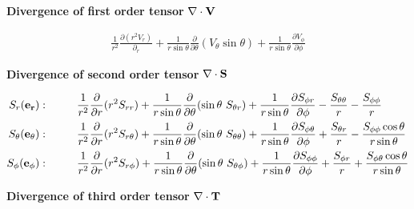 \documentclass[11pt]{article}
\newcommand{\dr}{\frac{\partial}{\partial r}}
\begin{document}
\begin{landscape}
\newpage

\noindent
{{\bf{Divergence of first order tensor}} $\nabla \cdot {\bf{V}}$}

\begin{align}
\frac{1}{r^2} \frac{\partial (r^2 V_r) }{\partial_r} + \frac{1}{r \sin{\theta}}\frac{\partial}{\partial \theta}(V_\theta \sin{\theta}) + \frac{1}{r \sin{\theta}} \frac{\partial V_\phi}{\partial \phi}
\end{align}

\noindent
{{\bf{Divergence of second order tensor}} $\nabla \cdot {\bf{S}}$}

\begin{align}
S_r ({\bf{e_r}}): & \hspace{1cm} \frac{1}{r^2}\dr (r^2 S_{rr}) + \frac{1}{r\sin{\theta}}\frac{\partial}{\partial \theta} (\sin{\theta} \ S_{\theta r}) + \frac{1}{r\sin{\theta}}\frac{\partial S_{\phi r}}{\partial \phi} - \frac{S_{\theta\theta}}{r} - \frac{S_{\phi\phi}}{r} \\
S_\theta ({\bf{e_\theta}}): & \hspace{1cm} \frac{1}{r^2}\dr (r^2 S_{r \theta}) + \frac{1}{r\sin{\theta}}\frac{\partial}{\partial \theta} (\sin{\theta} \ S_{\theta\theta}) + \frac{1}{r\sin{\theta}}\frac{\partial S_{\phi \theta}}{\partial \phi} + \frac{S_{\theta r}}{r} - \frac{S_{\phi\phi} \cos{\theta}}{r\sin{\theta}} \\
S_\phi ({\bf{e_\phi}}): & \hspace{1cm} \frac{1}{r^2}\dr (r^2 S_{r \phi}) + \frac{1}{r\sin{\theta}}\frac{\partial}{\partial \theta} (\sin{\theta} \ S_{\theta \phi}) + \frac{1}{r\sin{\theta}}\frac{\partial S_{\phi\phi}}{\partial \phi} + \frac{S_{\phi r}}{r} + \frac{S_{\phi \theta} \cos{\theta}}{r\sin{\theta}}
\end{align}

\noindent
{{\bf{Divergence of third order tensor}} $\nabla \cdot {\bf{T}}$}



\end{landscape}
\end{document}
